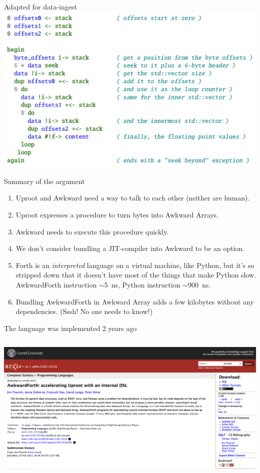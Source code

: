 \documentclass[aspectratio=169]{beamer}
\begin{document}
\begin{frame}{Adapted for data-ingest}
\vspace{0.25 cm}
\includegraphics[width=0.9\linewidth]{PLOTS/forth-parsing-example.png}
\end{frame}

\begin{frame}{Summary of the argument}
\large
\vspace{0.25 cm}
\begin{enumerate}\setlength{\itemsep}{0.35 cm}
\item<1-> Uproot and Awkward need a way to talk to each other (neither are human).
\item<2-> Uproot expresses a procedure to turn bytes into Awkward Arrays.
\item<3-> Awkward needs to execute this procedure quickly.
\item<4-> We don't consider bundling a JIT-compiler into Awkward to be an option.
\item<5-> Forth is an {\it interpreted} language on a virtual machine, like Python, but it's so stripped down that it doesn't have most of the things that make Python slow. AwkwardForth instruction $\sim$5~ns, Python instruction $\sim$900~ns.
\item<6-> Bundling AwkwardForth in Awkward Array adds a few kilobytes without any dependencies. (Sssh! No one needs to know!)
\end{enumerate}
\end{frame}

\begin{frame}{The language was implemented 2 years ago}
\vspace{0.17 cm}
\begin{columns}
\includegraphics[width=\linewidth]{PLOTS/AwkwardForth-paper.png}
\end{columns}
\end{frame}
\end{document}
